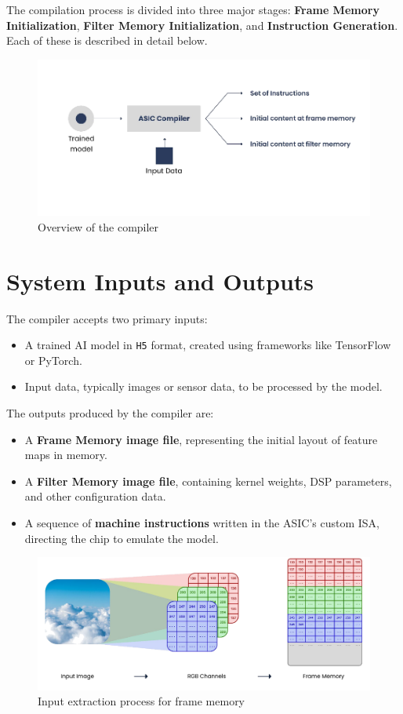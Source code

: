 \documentclass[12pt]{report}
\begin{document}
The compilation process is divided into three major stages: \textbf{Frame Memory Initialization}, \textbf{Filter Memory Initialization}, and \textbf{Instruction Generation}. Each of these is described in detail below.

\begin{figure}[!b]
    \centering
    \includegraphics[width=\textwidth]{asic_dnn_compiler1.png}
    \caption{Overview of the compiler}
    \label{label1}
\end{figure}

\section{System Inputs and Outputs}

The compiler accepts two primary inputs:
\begin{itemize}
    \item A trained AI model in \texttt{H5} format, created using frameworks like TensorFlow or PyTorch.
    \item Input data, typically images or sensor data, to be processed by the model.
\end{itemize}

The outputs produced by the compiler are:
\begin{itemize}
    \item A \textbf{Frame Memory image file}, representing the initial layout of feature maps in memory.
    \item A \textbf{Filter Memory image file}, containing kernel weights, DSP parameters, and other configuration data.
    \item A sequence of \textbf{machine instructions} written in the ASIC's custom ISA, directing the chip to emulate the model.
\end{itemize}

\begin{figure}[!b]
    \centering
    \includegraphics[width=\textwidth]{extract_ip_data1.png}
    \caption{Input extraction process for frame memory}
    \label{label4}
\end{figure}
\end{document}
